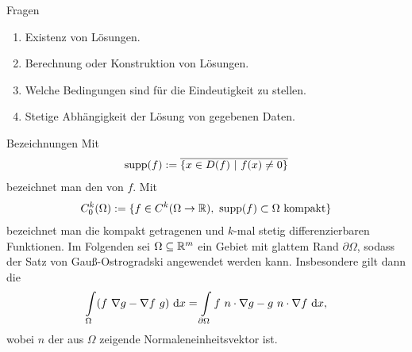 \begin{genericdf}{Fragen}
\renewcommand{\labelenumi}{\theenumi.}
\begin{enumerate}
\item Existenz von Lösungen.
\item Berechnung oder Konstruktion von Lösungen.
\item Welche Bedingungen sind für die Eindeutigkeit zu stellen.
\item Stetige Abhängigkeit der Lösung von gegebenen Daten.
\end{enumerate}
\end{genericdf}

\begin{genericdf}{Bezeichnungen}
Mit 
\begin{align*}
\operatorname{supp}(f) := \overline{\lbrace x \in D(f) \ | \ f(x) \neq 0 \rbrace}
\end{align*}
bezeichnet man den  von $f$.
Mit
\begin{align*}
C^k_0(\Omega) 
:=
\lbrace f \in C^k(\Omega \to \R), \ \supp(f) \subset \Omega \ \text{kompakt} \rbrace
\end{align*}
bezeichnet man die kompakt getragenen und $k$-mal stetig differenzierbaren Funktionen.
Im Folgenden sei $\Omega \subseteq \mathbb{R}^m$ ein Gebiet mit glattem Rand $\partial \Omega$, sodass der Satz von Gauß-Ostrogradski angewendet werden kann.
Insbesondere gilt dann die 
\begin{align*}
\int \limits_{\Omega} ( f \ \nabla g - \nabla f \ g ) \ \text{\rmfamily d} x
=
\int \limits_{\partial \Omega}
f \ n \cdot \nabla g - g \ n \cdot \nabla f \ \text{\rmfamily d} x,
\end{align*}
wobei $n$ der aus $\Omega$ zeigende Normaleneinheitsvektor ist.
\end{genericdf}
